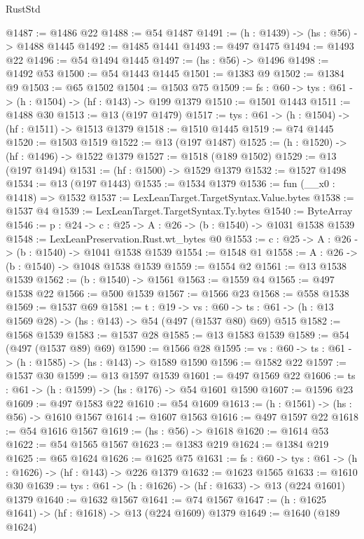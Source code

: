 \begin{lexlean}{RustStd}
\begin{coremodule}
@1487 := @1486 @22
@1488 := @54 @1487
@1491 := (h : @1439) -> (hs : @56) -> @1488 @1445
@1492 := @1485 @1441
@1493 := @497 @1475
@1494 := @1493 @22
@1496 := @54 @1494 @1445
@1497 := (hs : @56) -> @1496
@1498 := @1492 @53
@1500 := @54 @1443 @1445
@1501 := @1383 @9
@1502 := @1384 @9
@1503 := @65 @1502
@1504 := @1503 @75
@1509 := {fs : @60} -> {tys : @61} -> (h : @1504) -> (hf : @143) -> @199 @1379
@1510 := @1501 @1443
@1511 := @1488 @30
@1513 := @13 (@197 @1479)
@1517 := {tys : @61} -> (h : @1504) -> (hf : @1511) -> @1513 @1379
@1518 := @1510 @1445
@1519 := @74 @1445
@1520 := @1503 @1519
@1522 := @13 (@197 @1487)
@1525 := (h : @1520) -> (hf : @1496) -> @1522 @1379
@1527 := @1518 (@189 @1502)
@1529 := @13 (@197 @1494)
@1531 := (hf : @1500) -> @1529 @1379
@1532 := @1527 @1498
@1534 := @13 (@197 @1443)
@1535 := @1534 @1379
@1536 := fun (__x0 : @1418) => @1532
@1537 := LexLeanTarget.TargetSyntax.Value.bytes
@1538 := @1537 @4
@1539 := LexLeanTarget.TargetSyntax.Ty.bytes
@1540 := ByteArray
@1546 := {p : @24} -> {c : @25} -> {A : @26} -> (b : @1540) -> @1031 @1538 @1539
@1548 := LexLeanPreservation.Rust.wt_bytes @0
@1553 := {c : @25} -> {A : @26} -> (b : @1540) -> @1041 @1538 @1539
@1554 := @1548 @1
@1558 := {A : @26} -> (b : @1540) -> @1048 @1538 @1539
@1559 := @1554 @2
@1561 := @13 @1538 @1539
@1562 := (b : @1540) -> @1561
@1563 := @1559 @4
@1565 := @497 @1538 @22
@1566 := @500 @1539
@1567 := @1566 @23
@1568 := @558 @1538
@1569 := @1537 @69
@1581 := {t : @19} ->
  {vs : @60} -> {ts : @61} -> (h : @13 @1569 @28) -> (hs : @143) -> @54 (@497 (@1537 @80) @69) @515
@1582 := @1568 @1539
@1583 := @1537 @28
@1585 := @13 @1583 @1539
@1589 := @54 (@497 (@1537 @89) @69)
@1590 := @1566 @28
@1595 := {vs : @60} -> {ts : @61} -> (h : @1585) -> (hs : @143) -> @1589 @1590
@1596 := @1582 @22
@1597 := @1537 @30
@1599 := @13 @1597 @1539
@1601 := @497 @1569 @22
@1606 := {ts : @61} -> (h : @1599) -> (hs : @176) -> @54 @1601 @1590
@1607 := @1596 @23
@1609 := @497 @1583 @22
@1610 := @54 @1609
@1613 := (h : @1561) -> (hs : @56) -> @1610 @1567
@1614 := @1607 @1563
@1616 := @497 @1597 @22
@1618 := @54 @1616 @1567
@1619 := (hs : @56) -> @1618
@1620 := @1614 @53
@1622 := @54 @1565 @1567
@1623 := @1383 @219
@1624 := @1384 @219
@1625 := @65 @1624
@1626 := @1625 @75
@1631 := {fs : @60} -> {tys : @61} -> (h : @1626) -> (hf : @143) -> @226 @1379
@1632 := @1623 @1565
@1633 := @1610 @30
@1639 := {tys : @61} -> (h : @1626) -> (hf : @1633) -> @13 (@224 @1601) @1379
@1640 := @1632 @1567
@1641 := @74 @1567
@1647 := (h : @1625 @1641) -> (hf : @1618) -> @13 (@224 @1609) @1379
@1649 := @1640 (@189 @1624)

\end{coremodule}
\end{lexlean}
